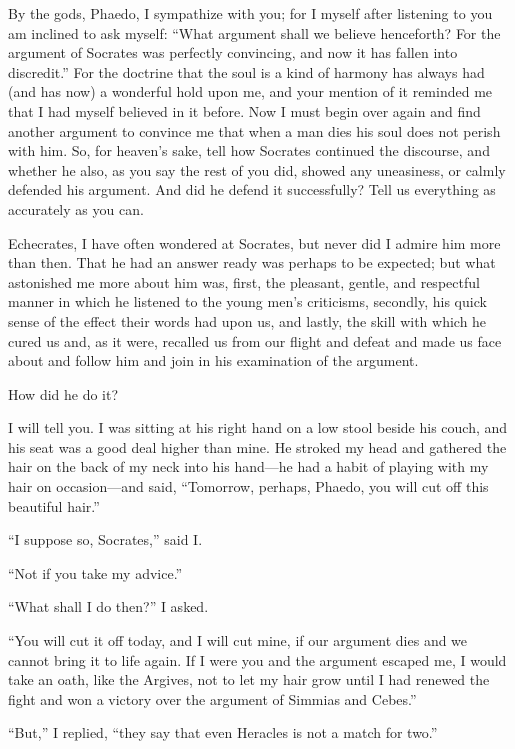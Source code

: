 \documentclass[letterpaper,12pt]{article}
\newcommand{\stephpag}[1]{\marginnote{\small\itshape\fontfamily{ppl}\selectfont #1}}
\begin{document}
\begin{drama}
\echecratesspeaks
By the gods, Phaedo, I sympathize with you; for I myself after listening to you am inclined to ask myself: \stephpag{d} ``What argument shall we believe henceforth? For the argument of Socrates was perfectly convincing, and now it has fallen into discredit.'' For the doctrine that the soul is a kind of harmony has always had (and has now) a wonderful hold upon me, and your mention of it reminded me that I had myself believed in it before. Now I must begin over again and find another argument to convince me that when a man dies his soul does not perish with him. So, for heaven's sake, tell how Socrates \stephpag{e} continued the discourse, and whether he also, as you say the rest of you did, showed any uneasiness, or calmly defended his argument. And did he defend it successfully? Tell us everything as accurately as you can.
 
\phaedospeaks
Echecrates, I have often wondered at Socrates, but never did I admire him more \stephpag{89 a} than then. That he had an answer ready was perhaps to be expected; but what astonished me more about him was, first, the pleasant, gentle, and respectful manner in which he listened to the young men's criticisms, secondly, his quick sense of the effect their words had upon us, and lastly, the skill with which he cured us and, as it were, recalled us from our flight and defeat and made us face about and follow him and join in his examination of the argument.
 
\echecratesspeaks
How did he do it?
 
\phaedospeaks
I will tell you. I was sitting at his right hand on a low stool \stephpag{b} beside his couch, and his seat was a good deal higher than mine. He stroked my head and gathered the hair on the back of my neck into his hand---he had a habit of playing with my hair on occasion---and said, ``Tomorrow, perhaps, Phaedo, you will cut off this beautiful hair.''
 
``I suppose so, Socrates,'' said I.
 
``Not if you take my advice.''
 
``What shall I do then?'' I asked.
 
``You will cut it off today, and I will cut mine, if our argument dies and we cannot bring it to life again. \stephpag{c} If I were you and the argument escaped me, I would take an oath, like the Argives, not to let my hair grow until I had renewed the fight and won a victory over the argument of Simmias and Cebes.''
 
``But,'' I replied, ``they say that even Heracles is not a match for two.''
 

\end{drama}
\end{document}
